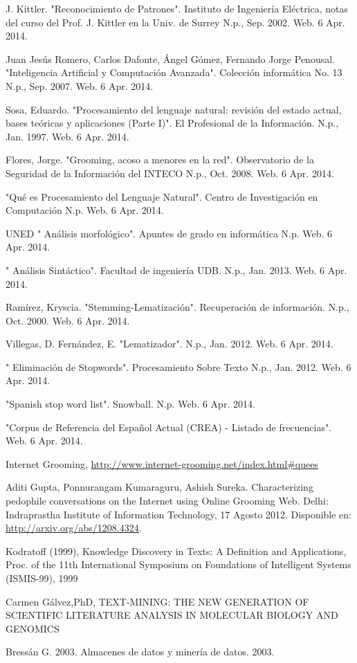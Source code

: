 
\begin{thebibliography}{99}


 J. Kittler. "Reconocimiento de Patrones". Instituto de Ingenier\'ia El\'ectrica, notas del curso del Prof. J. Kittler en la Univ. de Surrey N.p., Sep. 2002. Web. 6 Apr. 2014. 

 Juan Jes\'us Romero, Carlos Dafonte, \'Angel G\'omez, Fernando Jorge Penousal. "Inteligencia Artificial y Computaci\'on Avanzada". Colecci\'on inform\'atica No. 13 N.p., Sep. 2007. Web. 6 Apr. 2014. 

 Sosa, Eduardo. "Procesamiento del lenguaje natural: revisi\'on del estado actual, bases te\'oricas y aplicaciones (Parte I)". El Profesional de la Informaci\'on. N.p., Jan. 1997. Web. 6 Apr. 2014. 


 Flores, Jorge. "Grooming, acoso a menores en la red". Observatorio de la Seguridad de la Informaci\'on del INTECO N.p., Oct. 2008. Web. 6 Apr. 2014. 

 "Qu\'e es Procesamiento del Lenguaje Natural". Centro de Investigaci\'on en Computaci\'on N.p. Web. 6 Apr. 2014. 

 UNED " An\'alisis morfol\'ogico". Apuntes de grado en inform\'atica N.p. Web. 6 Apr. 2014. 


  " An\'alisis Sint\'actico". Facultad de ingenier\'ia UDB. N.p., Jan. 2013. Web. 6 Apr. 2014. 

 Ram\'irez, Kryscia. "Stemming-Lematizaci\'on". Recuperaci\'on de informaci\'on. N.p., Oct. 2000. Web. 6 Apr. 2014. 

 Villegas, D. Fern\'andez, E. "Lematizador".  N.p., Jan. 2012. Web. 6 Apr. 2014. 

  " Eliminaci\'on de Stopwords". Procesamiento Sobre Texto  N.p., Jan. 2012. Web. 6 Apr. 2014. 

 "Spanish stop word list". Snowball. N.p. Web. 6 Apr. 2014. 

 "Corpus de Referencia del Espa\~nol Actual (CREA) - Listado de frecuencias". Web. 6 Apr. 2014. 

 Internet Grooming, \url{http://www.internet-grooming.net/index.html#quees}

 Aditi Gupta, Ponnurangam Kumaraguru, Ashish Sureka. Characterizing pedophile conversations on the Internet using Online Grooming Web. Delhi: Indraprastha Institute of Information Technology, 17 Agosto 2012. Disponible en: \url{http://arxiv.org/abs/1208.4324}.

 Kodratoff (1999), Knowledge Discovery in Texts: A Definition and Applications, Proc. of the 11th International Symposium on Foundations of Intelligent Systems (ISMIS-99), 1999

 Carmen G\'alvez,PhD, TEXT-MINING: THE NEW GENERATION OF SCIENTIFIC LITERATURE ANALYSIS IN MOLECULAR BIOLOGY AND GENOMICS

  Bress\'an G. 2003. Almacenes de datos y miner\'ia de datos. 2003.

\end{thebibliography}

